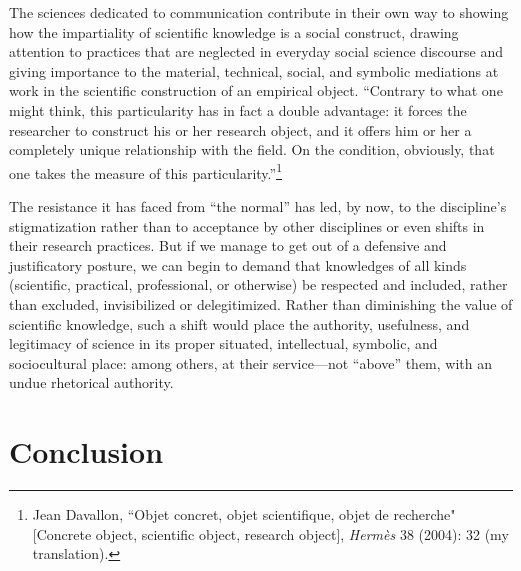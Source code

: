 \documentclass{tufte-handout}
\begin{document}
The sciences dedicated to communication contribute in their own way to
showing how the impartiality of scientific knowledge is a social
construct, drawing attention to practices that are neglected in everyday
social science discourse and giving importance to the material,
technical, social, and symbolic mediations at work in the scientific
construction of an empirical object. ``Contrary to what one might think,
this particularity has in fact a double advantage: it forces the
researcher to construct his or her research object, and it offers him or
her a completely unique relationship with the field. On the condition,
obviously, that one takes the measure of this
particularity.''\footnote{Jean Davallon, ``Objet concret, objet
  scientifique, objet de recherche" {[}Concrete object, scientific
  object, research object{]}, \emph{Hermès} 38 (2004): 32 (my
  translation).}

The resistance it has faced from ``the normal'' has led, by now, to the
discipline's stigmatization rather than to acceptance by other
disciplines or even shifts in their research practices. But if we manage
to get out of a defensive and justificatory posture, we can begin to
demand that knowledges of all kinds (scientific, practical,
professional, or otherwise) be respected and included, rather than
excluded, invisibilized or delegitimized. Rather than diminishing the
value of scientific knowledge, such a shift would place the authority,
usefulness, and legitimacy of science in its proper situated,
intellectual, symbolic, and sociocultural place: among others, at their
service---not ``above'' them, with an undue rhetorical authority.

\hypertarget{conclusion}{%
\section{Conclusion}\label{conclusion}}
\end{document}
